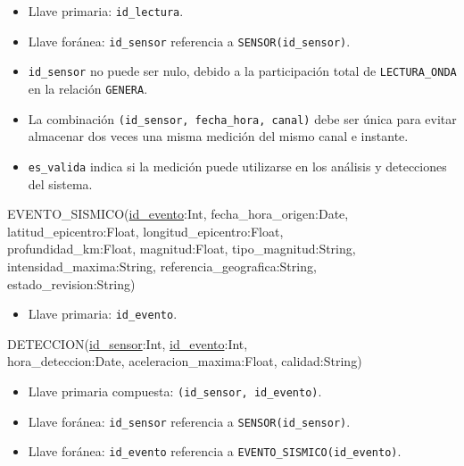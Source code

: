 \documentclass[12pt,a4paper]{article}
\begin{document}
\begin{itemize}
    \item Llave primaria: \texttt{id\_\allowbreak{}lectura}.
    \item Llave foránea: \texttt{id\_\allowbreak{}sensor} referencia a
    \texttt{SENSOR(id\_\allowbreak{}sensor)}.
    \item \texttt{id\_\allowbreak{}sensor} no puede ser nulo, debido a la participación total de \texttt{LECTURA\_\allowbreak{}ONDA} en la relación \texttt{GENERA}.
    \item La combinación \texttt{(id\_\allowbreak{}sensor, fecha\_\allowbreak{}hora, canal)} debe ser única para evitar almacenar dos veces una misma medición del mismo canal e instante.
    \item \texttt{es\_\allowbreak{}valida} indica si la medición puede utilizarse en los análisis y detecciones del sistema.
\end{itemize}

\noindent
\begin{minipage}{\linewidth}
\small\ttfamily\raggedright
EVENTO\_SISMICO(\underline{id\_evento}:Int, fecha\_hora\_origen:Date,\\
latitud\_epicentro:Float, longitud\_epicentro:Float,\\
profundidad\_km:Float, magnitud:Float, tipo\_magnitud:String,\\
intensidad\_maxima:String, referencia\_geografica:String,\\
estado\_revision:String)
\end{minipage}
\par\medskip

\begin{itemize}
    \item Llave primaria: \texttt{id\_\allowbreak{}evento}.
\end{itemize}

\noindent
\begin{minipage}{\linewidth}
\small\ttfamily\raggedright
DETECCION(\underline{id\_sensor}:Int, \underline{id\_evento}:Int,\\
hora\_deteccion:Date, aceleracion\_maxima:Float, calidad:String)
\end{minipage}
\par\medskip

\begin{itemize}
    \item Llave primaria compuesta:
    \texttt{(id\_\allowbreak{}sensor, id\_\allowbreak{}evento)}.
    \item Llave foránea: \texttt{id\_\allowbreak{}sensor} referencia a
    \texttt{SENSOR(id\_\allowbreak{}sensor)}.
    \item Llave foránea: \texttt{id\_\allowbreak{}evento} referencia a
    \texttt{EVENTO\_\allowbreak{}SISMICO(id\_\allowbreak{}evento)}.
\end{itemize}
\end{document}
